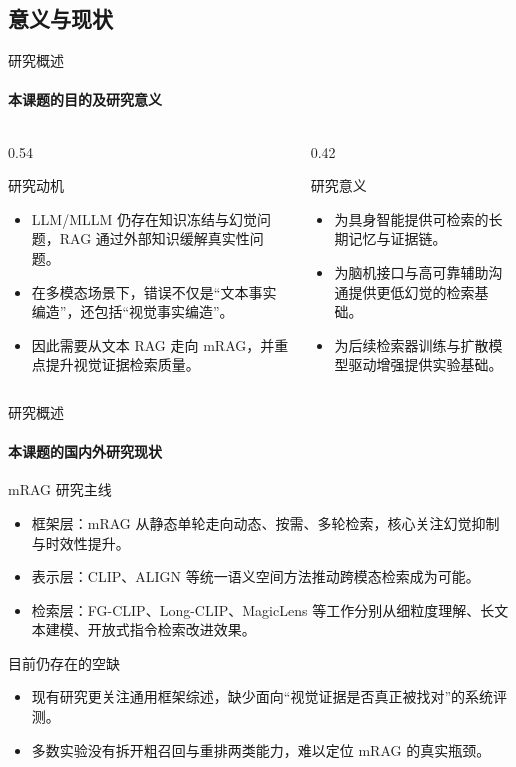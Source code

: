 \documentclass[10pt,aspectratio=169,]{beamer}
\begin{document}
\subsection{意义与现状}
\begin{frame}{研究概述}
	\framesubtitle{本课题的目的及研究意义}
	\begin{columns}[T]
		\begin{column}{0.54\textwidth}
			\begin{block}{研究动机}
				\begin{itemize}
					\item LLM/MLLM 仍存在知识冻结与幻觉问题，RAG 通过外部知识缓解真实性问题。
					\item 在多模态场景下，错误不仅是“文本事实编造”，还包括“视觉事实编造”。
					\item 因此需要从文本 RAG 走向 mRAG，并重点提升视觉证据检索质量。
				\end{itemize}
			\end{block}
		\end{column}
		\begin{column}{0.42\textwidth}
			\begin{alertblock}{研究意义}
				\begin{itemize}
					\item 为具身智能提供可检索的长期记忆与证据链。
					\item 为脑机接口与高可靠辅助沟通提供更低幻觉的检索基础。
					\item 为后续检索器训练与扩散模型驱动增强提供实验基础。
				\end{itemize}
			\end{alertblock}
		\end{column}
	\end{columns}
\end{frame}

\begin{frame}{研究概述}
	\framesubtitle{本课题的国内外研究现状}
	\begin{block}{mRAG 研究主线}
		\begin{itemize}
			\item 框架层：mRAG 从静态单轮走向动态、按需、多轮检索，核心关注幻觉抑制与时效性提升。
			\item 表示层：CLIP、ALIGN 等统一语义空间方法推动跨模态检索成为可能。
			\item 检索层：FG-CLIP、Long-CLIP、MagicLens 等工作分别从细粒度理解、长文本建模、开放式指令检索改进效果。
		\end{itemize}
	\end{block}
	\begin{alertblock}{目前仍存在的空缺}
		\begin{itemize}
			\item 现有研究更关注通用框架综述，缺少面向“视觉证据是否真正被找对”的系统评测。
			\item 多数实验没有拆开粗召回与重排两类能力，难以定位 mRAG 的真实瓶颈。
		\end{itemize}
	\end{alertblock}
\end{frame}
\end{document}
